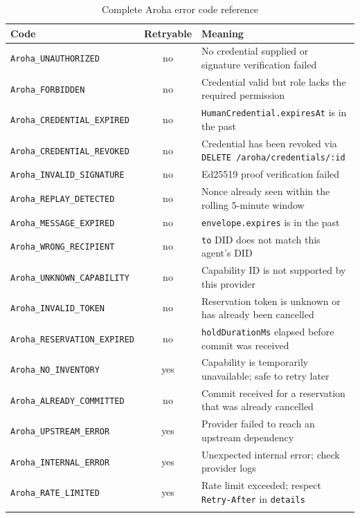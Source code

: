 \documentclass[11pt,a4paper]{article}
\begin{document}
\begin{longtable}{@{} l c X @{}}
  \toprule
  \textbf{Code} & \textbf{Retryable} & \textbf{Meaning} \\
  \midrule
  \endhead
  \texttt{Aroha\_UNAUTHORIZED}         & no  & No credential supplied or signature verification failed \\
  \texttt{Aroha\_FORBIDDEN}            & no  & Credential valid but role lacks the required permission \\
  \texttt{Aroha\_CREDENTIAL\_EXPIRED}  & no  & \texttt{HumanCredential.expiresAt} is in the past \\
  \texttt{Aroha\_CREDENTIAL\_REVOKED}  & no  & Credential has been revoked via \texttt{DELETE /aroha/credentials/:id} \\
  \texttt{Aroha\_INVALID\_SIGNATURE}   & no  & Ed25519 proof verification failed \\
  \texttt{Aroha\_REPLAY\_DETECTED}     & no  & Nonce already seen within the rolling 5-minute window \\
  \texttt{Aroha\_MESSAGE\_EXPIRED}     & no  & \texttt{envelope.expires} is in the past \\
  \texttt{Aroha\_WRONG\_RECIPIENT}     & no  & \texttt{to} DID does not match this agent's DID \\
  \texttt{Aroha\_UNKNOWN\_CAPABILITY}  & no  & Capability ID is not supported by this provider \\
  \texttt{Aroha\_INVALID\_TOKEN}       & no  & Reservation token is unknown or has already been cancelled \\
  \texttt{Aroha\_RESERVATION\_EXPIRED} & no  & \texttt{holdDurationMs} elapsed before commit was received \\
  \texttt{Aroha\_NO\_INVENTORY}        & yes & Capability is temporarily unavailable; safe to retry later \\
  \texttt{Aroha\_ALREADY\_COMMITTED}   & no  & Commit received for a reservation that was already cancelled \\
  \texttt{Aroha\_UPSTREAM\_ERROR}      & yes & Provider failed to reach an upstream dependency \\
  \texttt{Aroha\_INTERNAL\_ERROR}      & yes & Unexpected internal error; check provider logs \\
  \texttt{Aroha\_RATE\_LIMITED}        & yes & Rate limit exceeded; respect \texttt{Retry-After} in \texttt{details} \\
  \bottomrule
  \caption{Complete Aroha error code reference}
\end{longtable}
\end{document}

